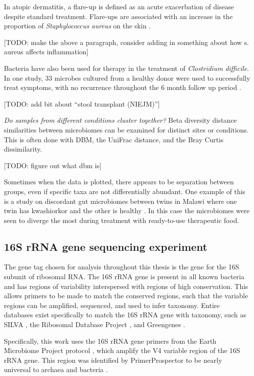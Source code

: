 In atopic dermatitis, a flare-up is defined as an acute exacerbation of disease despite standard treatment. Flare-ups are associated with an increase in the proportion of \textit{Staphylococcus aureus} on the skin \cite{kong2012temporal}.

[TODO: make the above a paragraph, consider adding in something about how s. aureus affects inflammation]

Bacteria have also been used for therapy in the treatment of \textit{Clostridium difficile}. In one study, 33 microbes cultured from a healthy donor were used to successfully treat symptoms, with no recurrence throughout the 6 month follow up period \cite{petrof2013stool}.

[TODO: add bit about ``stool transplant (NIEJM)'']

\textit{Do samples from different conditions cluster together?}
Beta diversity distance similarities between microbiomes can be examined for distinct sites or conditions. This is often done with DBM, the UniFrac distance, and the Bray Curtis dissimilarity.

[TODO: figure out what dbm is]

Sometimes when the data is plotted, there appears to be separation between groups, even if specific taxa are not differentially abundant. One example of this is a study on discordant gut microbiomes between twins in Malawi where one twin has kwashiorkor and the other is healthy \cite{smith2013gut}. In this case the microbiomes were seen to diverge the most during treatment with ready-to-use therapeutic food.

\subsection{16S rRNA gene sequencing experiment}
The gene tag chosen for analysis throughout this thesis is the gene for the 16S subunit of ribosomal RNA. The 16S rRNA gene is present in all known bacteria and has regions of variability interspersed with regions of high conservation. This allows primers to be made to match the conserved regions, such that the variable regions can be amplified, sequenced, and used to infer taxonomy. Entire databases exist specifically to match the 16S rRNA gene with taxonomy, such as SILVA \cite{quast2013silva}, the Ribosomal Database Project \cite{cole2009ribosomal}, and Greengenes \cite{desantis2006greengenes}.

Specifically, this work uses the 16S rRNA gene primers from the Earth Microbiome Project protocol \cite{gilbert2014earth}, which amplify the V4 variable region of the 16S rRNA gene. This region was identified by PrimerProspector to be nearly universal to archaea and bacteria \cite{walters2011primerprospector}.


